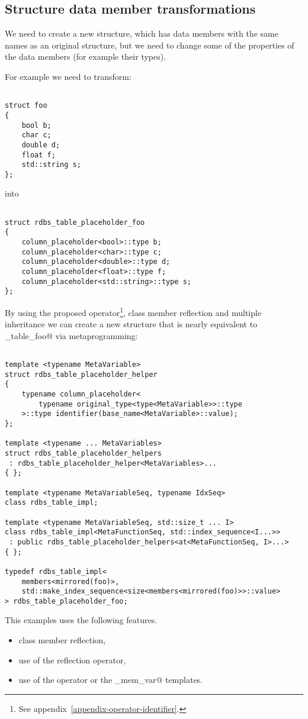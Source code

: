 \subsection{Structure data member transformations}
\label{use-case-struct-transf}

We need to create a new structure, which has data members with the same names
as an original structure, but we need to change some of the properties
of the data members (for example their types).

For example we need to transform:

\begin{verbatim}

struct foo
{
	bool b;
	char c;
	double d;
	float f;
	std::string s;
};

\end{verbatim}

into

\begin{verbatim}

struct rdbs_table_placeholder_foo
{
	column_placeholder<bool>::type b;
	column_placeholder<char>::type c;
	column_placeholder<double>::type d;
	column_placeholder<float>::type f;
	column_placeholder<std::string>::type s;
};

\end{verbatim}

By using the proposed \verb@identifier@ operator\footnote{See appendix~\ref{appendix-operator-identifier}.}, class member reflection
and multiple inheritance we can create a new structure that is
nearly equivalent to \verb@rdbs_table_foo@ via metaprogramming:

\begin{verbatim}

template <typename MetaVariable>
struct rdbs_table_placeholder_helper
{
	typename column_placeholder<
		typename original_type<type<MetaVariable>>::type
	>::type identifier(base_name<MetaVariable>::value);
};

template <typename ... MetaVariables>
struct rdbs_table_placeholder_helpers
 : rdbs_table_placeholder_helper<MetaVariables>...
{ };

template <typename MetaVariableSeq, typename IdxSeq>
class rdbs_table_impl;

template <typename MetaVariableSeq, std::size_t ... I>
class rdbs_table_impl<MetaFunctionSeq, std::index_sequence<I...>>
 : public rdbs_table_placeholder_helpers<at<MetaFunctionSeq, I>...>
{ };

typedef rdbs_table_impl<
	members<mirrored(foo)>,
	std::make_index_sequence<size<members<mirrored(foo)>>::value>
> rdbs_table_placeholder_foo;

\end{verbatim}

This examples uses the following features.

\begin{itemize}
\item{class member reflection,}
\item{use of the reflection operator,}
\item{use of the \verb@identifier@ operator or the \verb@named_mem_var@ templates.}
\end{itemize}

